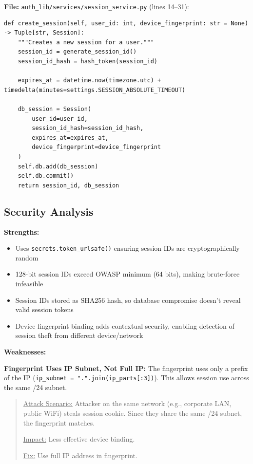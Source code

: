 \documentclass[11pt,a4paper]{article}
\begin{document}
\textbf{File:} \texttt{auth\_lib/services/session\_service.py} (lines 14--31):
\begin{lstlisting}
def create_session(self, user_id: int, device_fingerprint: str = None) -> Tuple[str, Session]:
    """Creates a new session for a user."""
    session_id = generate_session_id()
    session_id_hash = hash_token(session_id)
    
    expires_at = datetime.now(timezone.utc) + timedelta(minutes=settings.SESSION_ABSOLUTE_TIMEOUT)
    
    db_session = Session(
        user_id=user_id,
        session_id_hash=session_id_hash,
        expires_at=expires_at,
        device_fingerprint=device_fingerprint
    )
    self.db.add(db_session)
    self.db.commit()
    return session_id, db_session
\end{lstlisting}

\subsection{Security Analysis}

\textbf{Strengths:}
\begin{itemize}[noitemsep]
    \item Uses \texttt{secrets.token\_urlsafe()} ensuring session IDs are cryptographically random
    \item 128-bit session IDs exceed OWASP minimum (64 bits), making brute-force infeasible
    \item Session IDs stored as SHA256 hash, so database compromise doesn't reveal valid session tokens
    \item Device fingerprint binding adds contextual security, enabling detection of session theft from different device/network
\end{itemize}

\textbf{Weaknesses:}

\textbf{Fingerprint Uses IP Subnet, Not Full IP:} The fingerprint uses only a prefix of the IP (\texttt{ip\_subnet = ".".join(ip\_parts[:3])}). This allows session use across the same /24 subnet.

\begin{quote}
\underline{Attack Scenario:} Attacker on the same network (e.g., corporate LAN, public WiFi) steals session cookie. Since they share the same /24 subnet, the fingerprint matches.

\underline{Impact:} Less effective device binding.

\underline{Fix:} Use full IP address in fingerprint.
\end{quote}
\end{document}
